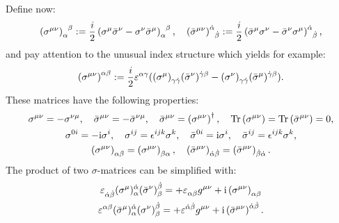 Define now:
\begin{equation}
	\tensor{\left(\sigma^{\mu \nu}\right)}{_{\alpha}^{\beta}} := \frac{i}{2} \tensor{\left(\sigma^{\mu} \bar{\sigma}^{\nu}-\sigma^{\nu} \bar{\sigma}^{\mu}\right)}{_{\alpha}^{\beta}}
	\text{,} \quad
	\tensor{\left(\bar{\sigma}^{\mu \nu}\right)}{^{\dot{\alpha}}_{\dot{\beta}}} := \frac{i}{2} \tensor{\left(\bar{\sigma}^{\mu} \sigma^{\nu}-\bar{\sigma}^{\nu} \sigma^{\mu}\right)}{^{\dot{\alpha}}_{\dot{\beta}}}
	\text{,}
	\label{eq:sigma2}
\end{equation}
and pay attention to the unusual index structure which yields for example:
\begin{equation}
	\begin{aligned}
		\tensor{\left(\sigma^{\mu \nu}\right)}{^{\alpha \beta}} := \frac{i}{2} \tensor{\eps}{^{\alpha \gamma}} (\tensor{(\sigma^{\mu})}{_{\gamma \dot{\gamma}}} \tensor{(\bar{\sigma}^{\nu})}{^{\dot{\gamma} \beta}} - \tensor{(\sigma^{\nu})}{_{\gamma \dot{\gamma}}} \tensor{(\bar{\sigma}^{\mu})}{^{\dot{\gamma} \beta}})
		\text{.}
	\end{aligned}
\end{equation}
These matrices have the following properties:
\begin{equation}
	\begin{gathered}
		\sigma^{\mu \nu} = -\sigma^{\nu \mu}, \quad
		\bar{\sigma}^{\mu \nu} = -\bar{\sigma}^{\nu \mu}, \quad
		\bar{\sigma}^{\mu \nu} = \left(\sigma^{\mu \nu}\right)^{\dagger}, \quad
		\Tr{\sigma^{\mu \nu}} = \Tr{\bar{\sigma}^{\mu \nu}} = 0 , \\
		\sigma^{0 i} = -\mi \sigma^{i}, \quad
		\sigma^{i j} = \epsilon^{i j k} \sigma^{k}, \quad
		\bar{\sigma}^{0 i} = \mi \sigma^{i}, \quad
		\bar{\sigma}^{i j} = \epsilon^{i j k} \sigma^{k}, \\
		\tensor{\left(\sigma^{\mu \nu}\right)}{_{\alpha \beta}} = \tensor{\left(\sigma^{\mu \nu}\right)}{_{\beta \alpha}}, \quad
		\tensor{\left(\bar{\sigma}^{\mu \nu}\right)}{_{\dot{\alpha} \dot{\beta}}} = \tensor{\left(\bar{\sigma}^{\mu \nu}\right)}{_{\dot{\beta} \dot{\alpha}}}
		\text{.}
	\end{gathered}
\end{equation}
The product of two $ \sigma $-matrices can be simplified with:
\begin{gather}
	\tensor{\eps}{_{\dot{\alpha} \dot{\beta}}} \tensor*{(\sigma^{\mu})}{^{\dot{\alpha}} _{\alpha}} \tensor*{(\bar{\sigma}^{\nu})}{^{\dot{\beta}} _{\beta}}
	= + \tensor{\eps}{_{\alpha \beta}} \metric^{\mu \nu} + \mi \tensor{\left(\sigma^{\mu \nu}\right)}{_{\alpha \beta}} \label{eq:metricandsigma2}\\
	\tensor{\eps}{^{\alpha \beta}} \tensor*{(\bar{\sigma}^{\mu})}{^{\dot{\alpha}} _{\alpha}} \tensor*{(\sigma^{\nu})}{^{\dot{\beta}} _{\beta}}
	= + \tensor{\eps}{^{\dot{\alpha} \dot{\beta}}} \metric^{\mu \nu} + \mi \tensor{\left(\bar{\sigma}^{\mu \nu}\right)}{^{\dot{\alpha} \dot{\beta}}} \label{eq:metricandsigma2bar}
	\text{.}
\end{gather}
